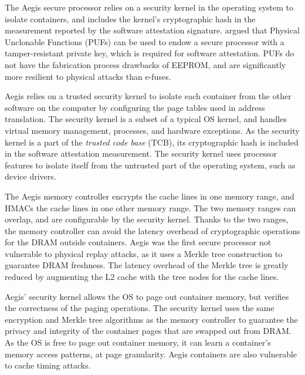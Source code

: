 
The Aegis secure processor \cite{suh2003aegis} relies on a security kernel in the operating system to isolate containers, and includes the kernel's cryptographic hash in the measurement reported by the software attestation signature.  \cite{aegis_impl} argued that
Physical Unclonable Functions (PUFs) \cite{gassend2002puf} can be used to
endow a secure processor with a tamper-resistant private key, which is required
for software attestation. PUFs do not have the fabrication process drawbacks of
EEPROM, and are significantly more resilient to physical attacks than e-fuses.

Aegis relies on a trusted security kernel to isolate each container from the
other software on the computer by configuring the page tables used in address
translation. The security kernel is a subset of a typical OS kernel, and
handles virtual memory management, processes, and hardware exceptions. As the
security kernel is a part of the \textit{trusted code base} (TCB), its
cryptographic hash is included in the software attestation measurement. The
security kernel uses processor features to isolate itself from the untrusted
part of the operating system, such as device drivers.

The Aegis memory controller encrypts the cache lines in one memory range, and
HMACs the cache lines in one other memory range. The two memory ranges can
overlap, and are configurable by the security kernel. Thanks to the two ranges,
the memory controller can avoid the latency overhead of cryptographic
operations for the DRAM outside containers. Aegis was the first secure processor not vulnerable to physical
replay attacks, as it uses a Merkle tree construction \cite{gassend2003merkle}
to guarantee DRAM freshness. The latency overhead of the Merkle tree is greatly
reduced by augmenting the L2 cache with the tree nodes for the cache lines.

Aegis' security kernel allows the OS to page out container memory, but verifies
the correctness of the paging operations. The security kernel uses the same
encryption and Merkle tree algorithms as the memory controller to guarantee the
privacy and integrity of the container pages that are swapped out from DRAM.
As the OS is free to page out container memory, it can learn a container's
memory access patterns, at page granularity. Aegis containers are also
vulnerable to cache timing attacks.
